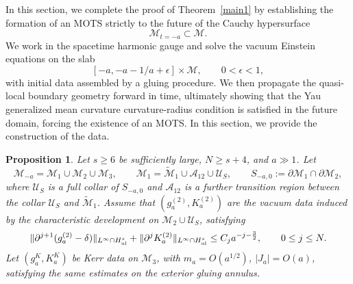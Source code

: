 \documentclass{amsart}
\newtheorem{proposition}{Proposition}[section]
\begin{document}
{\noindent In this section, we complete the proof of Theorem~\ref{main1} by establishing the formation of an MOTS strictly to the future of the Cauchy hypersurface
\[
\mathcal{M}_{t=-a}\subset \mathcal{M}.
\]
We work in the spacetime harmonic gauge and solve the vacuum Einstein equations on the slab 
\[
[-a,-a-1/a+\epsilon]\times\mathcal{M},
\qquad 0<\epsilon< 1,
\]
with initial data assembled by a gluing procedure.  We then propagate the quasi-local boundary geometry forward in time, ultimately showing that the Yau generalized mean curvature curvature-radius condition is satisfied in the future domain, forcing the existence of an MOTS. In this section, we provide the construction of the data. 



\begin{proposition}
\label{cauchy1}
Let \(s\ge 6\) be sufficiently large, \(N\ge s+4\), and \(a\gg1\). Let
\[
        \mathcal M_{-a}=\mathcal M_1\cup\mathcal M_2\cup\mathcal M_3,
        \qquad
        \mathcal M_1=\widetilde{\mathcal M}_1\cup\mathcal A_{12}\cup\mathcal U_S,
        \qquad
        S_{-a,0}:=\partial\mathcal M_1\cap\partial\mathcal M_2,
\]
where \(\mathcal U_S\) is a full collar of \(S_{-a,0}\) and $\mathcal{A}_{12}$ is a further transition region between the collar $\mathcal{U}_{S}$ and $\widetilde{\mathcal{M}}_{1}$. Assume that
\((g_a^{(2)},K_a^{(2)})\) are the vacuum data induced by the characteristic
development on \(\mathcal M_2\cup\mathcal U_S\), satisfying
\[
        \|\partial^{j+1}(g_a^{(2)}-\delta)\|_{L^\infty\cap H^s_{\rm ul}}
        +
        \|\partial^jK_a^{(2)}\|_{L^\infty\cap H^s_{\rm ul}}
        \le C_j a^{-j-\frac32},
        \qquad 0\le j\le N.
\]
Let \((g_a^K,K_a^K)\) be Kerr data on \(\mathcal M_3\), with
\(m_a=O(a^{1/2})\), \(|J_a|=O(a)\), satisfying the same estimates on the
exterior gluing annulus.


\end{proposition}}
\end{document}

